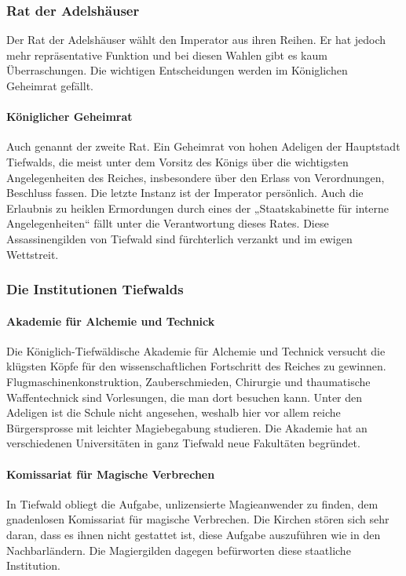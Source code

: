 \documentclass[10pt,twoside,twocolumn,openany]{book}
\begin{document}
\subsubsection{Rat der Adelshäuser}
Der Rat der Adelshäuser wählt den Imperator aus ihren Reihen. Er hat jedoch mehr repräsentative Funktion und bei diesen Wahlen gibt es kaum Überraschungen. Die wichtigen Entscheidungen werden im Königlichen Geheimrat gefällt.

\paragraph{Königlicher Geheimrat} Auch genannt der zweite Rat. Ein Geheimrat von hohen Adeligen der Hauptstadt Tiefwalds, die meist unter dem Vorsitz des Königs über die wichtigsten Angelegenheiten des Reiches, insbesondere über den Erlass von Verordnungen, Beschluss fassen. Die letzte Instanz ist der Imperator persönlich. Auch die Erlaubnis zu heiklen Ermordungen durch eines der „Staatskabinette für interne Angelegenheiten“ fällt unter die Verantwortung dieses Rates. Diese Assassinengilden von Tiefwald sind fürchterlich verzankt und im ewigen Wettstreit.




\subsubsection{Die Institutionen Tiefwalds}

\paragraph{Akademie für Alchemie und Technick} Die Königlich-Tiefwäldische Akademie für Alchemie und Technick versucht die klügsten Köpfe für den wissenschaftlichen Fortschritt des Reiches zu gewinnen. Flugmaschinenkonstruktion, Zauberschmieden, Chirurgie und thaumatische Waffentechnick sind Vorlesungen, die man dort besuchen kann. Unter den Adeligen ist die Schule nicht angesehen, weshalb hier vor allem reiche Bürgersprosse mit leichter Magiebegabung studieren. Die Akademie hat an verschiedenen Universitäten in ganz Tiefwald neue Fakultäten begründet.

\paragraph{Komissariat für Magische Verbrechen} In Tiefwald obliegt die Aufgabe, unlizensierte Magieanwender zu finden, dem gnadenlosen Komissariat für magische Verbrechen. Die Kirchen stören sich sehr daran, dass es ihnen nicht gestattet ist, diese Aufgabe auszuführen wie in den Nachbarländern. Die Magiergilden dagegen befürworten diese staatliche Institution.
\end{document}
